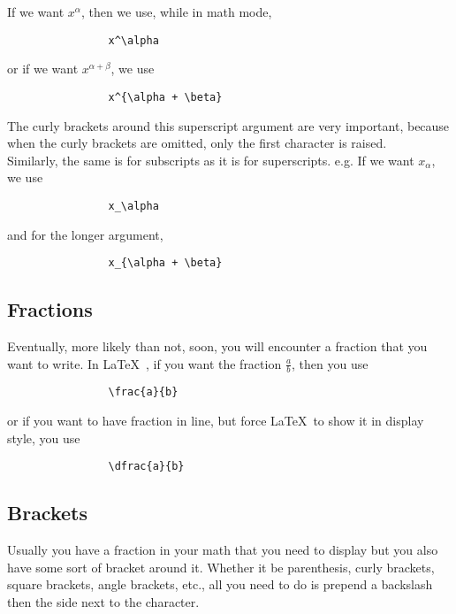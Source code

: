 \documentclass[11pt,letterpaper,twoside,titlepage]{article}
\newcommand{\latex}{\LaTeX \ }
\begin{document}
			If we want $x^\alpha$, then we use, while in math mode,
			
			\begin{verbatim}
				x^\alpha
			\end{verbatim}
			
			or if we want $x^{\alpha + \beta}$, we use
			
			\begin{verbatim}
				x^{\alpha + \beta}
			\end{verbatim}
			
			The curly brackets around this superscript argument are very important, because when the curly brackets are omitted, only the first character is raised. \\
			
			Similarly, the same is for subscripts as it is for superscripts. e.g. If we want $x_\alpha$, we use
			
			\begin{verbatim}
				x_\alpha
			\end{verbatim}
			
			and for the longer argument,
			
			\begin{verbatim}
				x_{\alpha + \beta}
			\end{verbatim}
			
		\subsection{Fractions}
		
			Eventually, more likely than not, soon, you will encounter a fraction that you want to write.  In \latex, if you want the fraction $\frac{a}{b}$, then you use
			
			\begin{verbatim}
				\frac{a}{b}
			\end{verbatim}
			
			or if you want to have fraction in line, but force \latex to show it in display style, you use
			
			\begin{verbatim}
				\dfrac{a}{b}
			\end{verbatim}
			
		\subsection{Brackets}
		
			Usually you have a fraction in your math that you need to display but you also have some sort of bracket around it.  Whether it be parenthesis, curly brackets, square brackets, angle brackets, etc., all you need to do is prepend a backslash then the side next to the character. \\
			
\end{document}
